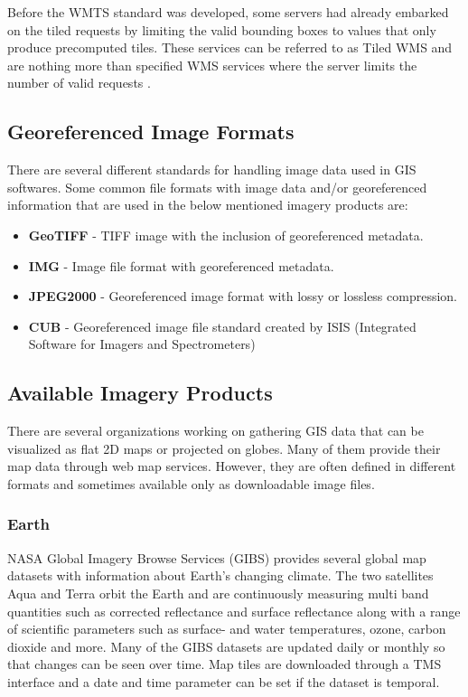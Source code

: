 Before the WMTS standard was developed, some servers had already embarked on the tiled requests by limiting the valid bounding boxes to values that only produce precomputed tiles. These services can be referred to as Tiled WMS and are nothing more than specified WMS services where the server limits the number of valid requests \cite{wmts10}.

\subsection{Georeferenced Image Formats}

There are several different standards for handling image data used in GIS softwares. Some common file formats with image data and/or georeferenced information that are used in the below mentioned imagery products are:

\begin{itemize}  
\item \textbf{GeoTIFF} - TIFF image with the inclusion of georeferenced metadata. 
\item \textbf{IMG} - Image file format with georeferenced metadata. 
\item \textbf{JPEG2000} - Georeferenced image format with lossy or lossless compression.
\item \textbf{CUB} - Georeferenced image file standard created by ISIS (Integrated Software for Imagers and Spectrometers)
\end{itemize}

\subsection{Available Imagery Products}

There are several organizations working on gathering GIS data that can be visualized as flat 2D maps or projected on globes. Many of them provide their map data through web map services. However, they are often defined in different formats and sometimes available only as downloadable image files.

\subsubsection{Earth}

NASA Global Imagery Browse Services (GIBS) provides several global map datasets with information about Earth's changing climate. The two satellites Aqua and Terra orbit the Earth and are continuously measuring multi band quantities such as corrected reflectance and surface reflectance along with a range of scientific parameters such as surface- and water temperatures, ozone, carbon dioxide and more. Many of the GIBS datasets are updated daily or monthly so that changes can be seen over time. Map tiles are downloaded through a TMS interface and a date and time parameter can be set if the dataset is temporal.

